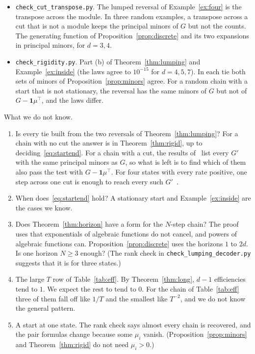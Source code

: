 \documentclass[11pt]{article}
\theoremstyle{definition}
\theoremstyle{remark}
\newcommand{\one}{\mathbf 1}
\begin{document}
\begin{itemize}[itemsep=1pt]
\item \texttt{check\_cut\_transpose.py}. The lumped reversal of
 Example~\ref{ex:four} is the transpose across the module. In three random
 examples, a transpose across a cut that is not a module keeps the principal
 minors of $G$ but not the counts.
 The generating function of Proposition~\ref{prop:discrete} and its two
 expansions in principal minors, for $d=3,4$.
\item \texttt{check\_rigidity.py}. Part (b) of Theorem~\ref{thm:lumping} and
 Example~\ref{ex:inside} (the laws agree to $10^{-15}$ for $d=4,5,7$). In each
 tie both sets of minors of Proposition~\ref{prop:minors} agree. For a random
 chain with a start that is not stationary, the reversal has the same minors of
 $G$ but not of $G-\one\mu^{\top}$, and the laws differ.
\end{itemize}

What we do not know.
\begin{enumerate}[1.,itemsep=1pt]
\item Is every tie built from the two reversals of Theorem~\ref{thm:lumping}?
 For a chain with no cut the answer is in Theorem~\ref{thm:rigid}, up to
 deciding~\eqref{eq:startend}. For a chain with a cut, the results
 of~\cite{cggr2025} list every $G'$ with the same principal minors as $G$, so
 what is left is to find which of them also pass the test with
 $G-\one\mu^{\top}$. For four states with every rate positive, one step across
 one cut is enough to reach every such $G'$~\cite[Lemma~3.1]{cggr2025}.
\item When does~\eqref{eq:startend} hold? A stationary start and
 Example~\ref{ex:inside} are the cases we know.
\item Does Theorem~\ref{thm:horizon} have a form for the $N$-step chain? The
 proof uses that exponentials of algebraic functions do not cancel, and powers
 of algebraic functions can. Proposition~\ref{prop:discrete} uses the
 horizons $1$ to $2d$. Is one horizon $N\ge3$ enough? (The rank check in
 \texttt{check\_lumping\_decoder.py} suggests that it is for three states.)
\item The large $T$ row of Table~\ref{tab:eff}. By Theorem~\ref{thm:long},
 $d-1$ efficiencies tend to $1$. We expect the rest to tend to $0$. For the
 chain of Table~\ref{tab:eff} three of them fall off like $1/T$ and the smallest
 like $T^{-2}$, and we do not know the general pattern.
\item A start at one state. The rank check says almost every chain is
 recovered, and the pair formulas change because some $\mu_i$ vanish.
 (Proposition~\ref{prop:minors} and Theorem~\ref{thm:rigid} do not need
 $\mu_i>0$.)
\end{enumerate}
\end{document}
